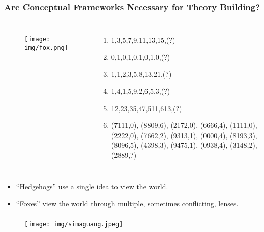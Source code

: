 \documentclass[UTF8,11pt,colorlinks,compress,openany]{beamer}%
\begin{document}
\begin{frame}\frametitle{Are Conceptual Frameworks Necessary for Theory Building?}
\begin{columns}
\begin{figure}[H]
\texttt{[image: img/fox.png]}
\end{figure}
\begin{enumerate}
\item 1,3,5,7,9,11,13,15,(?)
\item 0,1,0,1,0,1,0,1,0,(?)
\item 1,1,2,3,5,8,13,21,(?)
\item 1,4,1,5,9,2,6,5,3,(?)
\item 12,23,35,47,511,613,(?)
\item (7111,0), (8809,6), (2172,0), (6666,4), (1111,0), (2222,0), (7662,2), (9313,1), (0000,4), (8193,3), (8096,5), (4398,3), (9475,1), (0938,4), (3148,2), (2889,?)
\end{enumerate}
\end{columns}
\begin{itemize}
	\item ``Hedgehogs'' use a single idea to view the world.
	\item ``Foxes'' view the world through multiple, sometimes conflicting, lenses.
\end{itemize}
\end{frame}

\begin{frame}\frametitle{}
\begin{figure}[H]
\texttt{[image: img/simaguang.jpeg]}
\end{figure}
\end{frame}
\end{document}
